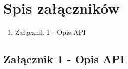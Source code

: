 \documentclass[a4paper,11pt,twoside]{report}
\theoremstyle{definition}
\begin{document}

\chapter*{Spis załączników}
\begin{enumerate}[itemsep = 0pt]
\item Załącznik 1 - Opis API
\end{enumerate}
\thispagestyle{empty}


\newpage
\pagestyle{empty} 
\section{Załącznik 1 - Opis API}

\end{document}
